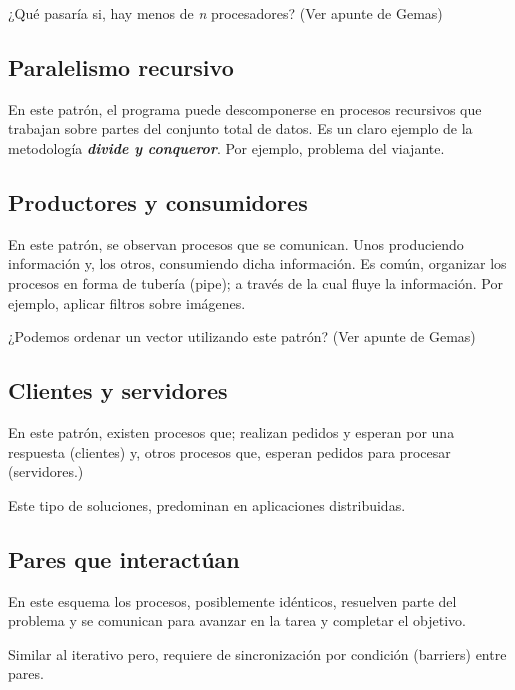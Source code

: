 \documentclass[a4paper, 10pt]{report}
\begin{document}
\begin{basic_box}
 ¿Qué pasaría si, hay menos de \emph{n} procesadores? (Ver apunte de Gemas)
\end{basic_box}



\subsection{Paralelismo recursivo}

En este patrón, el programa puede descomponerse en procesos recursivos que trabajan sobre partes del conjunto total de datos. Es un claro ejemplo de la metodología \textbf{\emph{divide y conqueror}}.
Por ejemplo, problema del viajante.

\subsection{Productores y consumidores}

En este patrón, se observan procesos que se comunican. Unos produciendo información y, los otros, consumiendo dicha información. Es común, organizar los procesos en forma de tubería (pipe); a través de la cual fluye la información.
Por ejemplo, aplicar filtros sobre imágenes.

\begin{basic_box}
     ¿Podemos ordenar un vector utilizando este patrón? (Ver apunte de Gemas)
\end{basic_box}

\subsection{Clientes y servidores}

En este patrón, existen procesos que; realizan pedidos y esperan por una respuesta (clientes) y, otros procesos que, esperan pedidos para procesar (servidores.)

Este tipo de soluciones, predominan en aplicaciones distribuidas.

\subsection{Pares que interactúan}

En este esquema los procesos, posiblemente idénticos, resuelven parte del problema y se comunican para avanzar en la tarea y completar el objetivo.

Similar al iterativo pero, requiere de sincronización por condición (barriers) entre pares.
\end{document}
